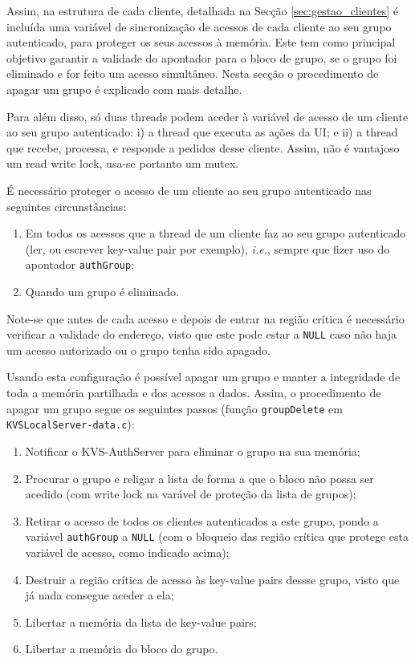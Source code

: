 Assim, na estrutura de cada cliente, detalhada na Secção \ref{sec:gestao_clientes} é incluída uma variável de sincronização de acessos de cada cliente ao seu grupo autenticado, para proteger os seus acessos à memória. Este tem como principal objetivo garantir a validade do apontador para o bloco de grupo, se o grupo foi eliminado e for feito um acesso simultâneo. Nesta secção o procedimento de apagar um grupo é explicado com mais detalhe.

Para além disso, só duas threads podem aceder à variável de acesso de um cliente ao seu grupo autenticado: i) a thread que executa as ações da UI; e ii) a thread que recebe, processa, e responde a pedidos desse cliente. Assim, não é vantajoso um read write lock, usa-se portanto um mutex.

É necessário proteger o acesso de um cliente ao seu grupo autenticado nas seguintes circunstâncias:
\begin{enumerate}[noitemsep]
    \item Em todos os acessos que a thread de um cliente faz ao seu grupo autenticado (ler, ou escrever key-value pair por exemplo), \textit{i.e.}, sempre que fizer uso do apontador \texttt{authGroup};
    \item Quando um grupo é eliminado.
\end{enumerate}

Note-se que antes de cada acesso e depois de entrar na região crítica é necessário verificar a validade do endereço, visto que este pode estar a \texttt{NULL} caso não haja um acesso autorizado ou o grupo tenha sido apagado.

Usando esta configuração é possível apagar um grupo e manter a integridade de toda a memória partilhada e dos acessos a dados. Assim, o procedimento de apagar um grupo segue os seguintes passos (função \texttt{groupDelete} em \texttt{KVSLocalServer-data.c}):
\begin{enumerate}[noitemsep]
    \item Notificar o KVS-AuthServer para eliminar o grupo na sua memória;
    \item Procurar o grupo e religar a lista de forma a que o bloco não possa ser acedido (com write lock na varável de proteção da lista de grupos);
    \item Retirar o acesso de todos os clientes autenticados a este grupo, pondo a variável \texttt{authGroup} a \texttt{NULL} (com o bloqueio das região crítica que protege esta variável de acesso, como indicado acima);
    \item Destruir a região crítica de acesso às key-value pairs dessse grupo, visto que já nada consegue aceder a ela;
    \item Libertar a memória da lista de key-value pairs;
    \item Libertar a memória do bloco do grupo.
\end{enumerate}

